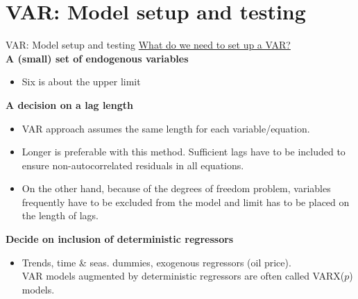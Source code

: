 \documentclass[usenames,dvipsnames]{beamer}
\begin{document}
\section{VAR: Model setup and testing}
\begin{frame}{VAR: Model setup and testing}
\small
\underline{What do we need to set up a VAR?}\\
\vspace*{3mm}
\textbf{A (small) set of endogenous variables}
\vspace*{-1.5mm}
\begin{itemize}
\item Six is about the upper limit
\end{itemize}
\textbf{A decision on a lag length}
\vspace*{-1.3mm}
	\begin{itemize}
	\item VAR approach assumes the same length for each variable/equation.
	\vspace*{-0.7mm}
	\item Longer is preferable with this method. Sufficient lags have to be included to ensure non-autocorrelated residuals in all equations.
	\vspace*{-0.7mm}
	\item On the other hand, because of the degrees of freedom problem, variables frequently have to be excluded from the model and limit has to be placed on the length of lags.
	\end{itemize}
\textbf{Decide on inclusion of deterministic regressors}
\vspace*{-1.5mm}
\begin{itemize}
\item Trends, time \& seas. dummies, exogenous regressors (oil price). \\VAR models augmented by deterministic regressors are often called VARX($p$) models.
\end{itemize}
\end{frame}
\end{document}
